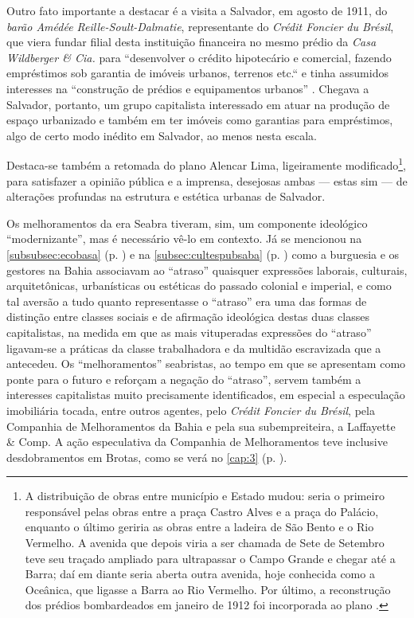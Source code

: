 Outro fato importante a destacar é a visita a Salvador, em agosto de 1911, do \textit{barão Amédée Reille-Soult-Dalmatie}, representante do \textit{Crédit Foncier du Brésil}, que viera fundar filial desta instituição financeira no mesmo prédio da \textit{Casa Wildberger \& Cia.} para ``desenvolver o crédito hipotecário e comercial, fazendo empréstimos sob garantia de imóveis urbanos, terrenos etc.`` e tinha assumidos interesses na ``construção de prédios e equipamentos urbanos'' \cite[pp.~115-116]{CUNHA2011}. Chegava a Salvador, portanto, um grupo capitalista interessado em atuar na produção de espaço urbanizado e também em ter imóveis como garantias para empréstimos, algo de certo modo inédito em Salvador, ao menos nesta escala.

Destaca-se também a retomada do plano Alencar Lima, ligeiramente modificado\footnote{A distribuição de obras entre município e Estado mudou: seria o primeiro responsável pelas obras entre a praça Castro Alves e a praça do Palácio, enquanto o último geriria as obras entre a ladeira de São Bento e o Rio Vermelho. A avenida que depois viria a ser chamada de Sete de Setembro teve seu traçado ampliado para ultrapassar o Campo Grande e chegar até a Barra; daí em diante seria aberta outra avenida, hoje conhecida como a Oceânica, que ligasse a Barra ao Rio Vermelho. Por último, a reconstrução dos prédios bombardeados em janeiro de 1912 foi incorporada ao plano \cite[p.~101]{CUNHA2011}.}, para satisfazer a opinião pública e a imprensa, desejosas ambas --- estas sim --- de alterações profundas na estrutura e estética urbanas de Salvador.

Os melhoramentos da era Seabra tiveram, sim, um componente ideológico ``modernizante'', mas é necessário vê-lo em contexto. Já se mencionou na \autoref{subsubsec:ecobasa} (p. \pageref{subsubsec:ecobasa}) e na \autoref{subsec:cultespubsaba} (p. \pageref{subsec:cultespubsaba}) como a burguesia e os gestores na Bahia associavam ao ``atraso'' quaisquer expressões laborais, culturais, arquitetônicas, urbanísticas ou estéticas do passado colonial e imperial, e como tal aversão a tudo quanto representasse o ``atraso'' era uma das formas de distinção entre classes sociais e de afirmação ideológica destas duas classes capitalistas, na medida em que as mais vituperadas expressões do ``atraso'' ligavam-se a práticas da classe trabalhadora e da multidão escravizada que a antecedeu. Os ``melhoramentos'' seabristas, ao tempo em que se apresentam como ponte para o futuro e reforçam a negação do ``atraso'', servem também a interesses capitalistas muito precisamente identificados, em especial a especulação imobiliária tocada, entre outros agentes, pelo \textit{Crédit Foncier du Brésil}, pela Companhia de Melhoramentos da Bahia e pela sua subempreiteira, a Laffayette \& Comp. A ação especulativa da Companhia de Melhoramentos teve inclusive desdobramentos em Brotas, como se verá no \autoref{cap:3} (p. \pageref{cap:3}).

